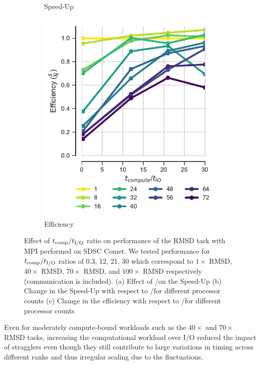 \begin{figure}[ht!]
\begin{subfigure}{.3\textwidth}
  \caption{Speed-Up}
  \label{fig:S2_tcomp_tIO_effect}
\end{subfigure}
\hfill
\begin{subfigure}{.3\textwidth}
  \includegraphics[width=\linewidth]{figures/Compute_to_IO_ratio_on_performance_2d_3_v17.pdf}
  \caption{Efficiency}
  \label{fig:E_tcomp_tIO_effect}
\end{subfigure}
%
\caption{Effect of ${t}_{\text{comp}}/{t}_{\text{I/O}}$ ratio on performance of the RMSD task with MPI performed on SDSC Comet. We tested performance for ${t}_{\text{comp}}/{t}_{\text{I/O}}$ ratios of 0.3, 12, 21, 30
which correspond to $1\times$ RMSD, $40\times$ RMSD, $70\times$ RMSD, and $100\times$ RMSD respectively (communication is included). (a) Effect of \tcomp/\tIO on the Speed-Up
(b) Change in the Speed-Up with respect to \tcomp/\tIO for different processor counts (c) Change in the efficiency with respect to \tcomp/\tIO for different processor counts}
\label{fig:tcomp_tIO_effect}
\end{figure}

Even for moderately compute-bound workloads such
as the $40\times$ and $70\times$ RMSD tasks, increasing the computational workload over I/O reduced the impact of stragglers even
though they still contribute to large variations in timing across different ranks and thus irregular scaling due to the fluctuations.

